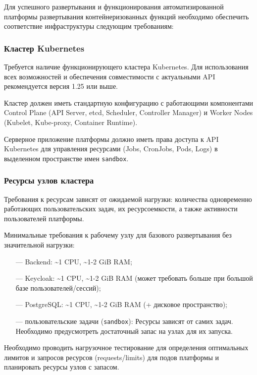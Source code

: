 Для успешного развертывания и функционирования автоматизированной платформы развертывания контейнеризованных функций необходимо обеспечить соответствие инфраструктуры следующим требованиям:

\subsubsection{Кластер Kubernetes}

Требуется наличие функционирующего кластера Kubernetes. Для использования всех возможностей и обеспечения совместимости с актуальными API рекомендуется версия 1.25 или выше.

Кластер должен иметь стандартную конфигурацию с работающими компонентами Control Plane (API Server, etcd, Scheduler, Controller Manager) и Worker Nodes (Kubelet, Kube-proxy, Container Runtime).

Серверное приложение платформы должно иметь права доступа к API Kubernetes для управления ресурсами (Jobs, CronJobs, Pods, Logs) в выделенном пространстве имен \texttt{sandbox}.

\subsubsection{Ресурсы узлов кластера}

Требования к ресурсам зависят от ожидаемой нагрузки: количества одновременно работающих пользовательских задач, их ресурсоемкости, а также активности пользователей платформы.

Минимальные требования к рабочему узлу для базового развертывания без значительной нагрузки:

\begin{itemize}
    \item[---] Backend: \textasciitilde 1 CPU, \textasciitilde 1-2 GiB RAM;
    \item[---] Keycloak: \textasciitilde 1 CPU, \textasciitilde 1-2 GiB RAM (может требовать больше при большой базе пользователей/сессий);
    \item[---] PostgreSQL: \textasciitilde 1 CPU, \textasciitilde 1-2 GiB RAM (+ дисковое пространство);
    \item[---] пользовательские задачи (\texttt{sandbox}): Ресурсы зависят от самих задач. Необходимо предусмотреть достаточный запас на узлах для их запуска.
\end{itemize}

Необходимо проводить нагрузочное тестирование для определения оптимальных лимитов и запросов ресурсов (requests/limits) для подов платформы и планировать ресурсы узлов с запасом.

